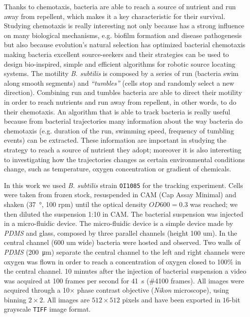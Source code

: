\documentclass[conference]{IEEEtran}
\begin{document}
Thanks to chemotaxis, bacteria are able to reach a source of nutrient and run away from repellent, which makes it a key characteristic for their survival. Studying chemotaxis is really interesting not only because has a strong influence on many biological mechanisms, e.g. biofilm formation and disease pathogenesis but also because  evolution's natural selection has optimized bacterial chemotaxis making bacteria excellent source-seekers and their strategies can be used to design bio-inspired, simple and efficient algorithms for robotic source locating systems. 
The motility  \textit{B. subtilis} is composed by a series of run (bacteria swim along smooth segments) and \textit{``tumbles''} (cells stop and randomly select a new direction).
Combining run and tumbles bacteria are able to direct their motility in order to reach nutrients and run away from repellent, in other words, to do their chemotaxis.
An algorithm that is able to track bacteria is really useful  because from bacterial trajectories many information about the way bacteria do chemotaxis (e.g. duration of the run, swimming speed, frequency of tumbling events) can be extracted. 
These information are important in studying the strategy to reach a source of nutrient they adopt; moreover it is also interesting to investigating how the trajectories changes as certain environmental conditions change, such as temperature, oxygen concentration or gradient of chemicals.


In this work we used \textit{B. subtilis} strain \texttt{OI1085} for the tracking experiment. Cells were taken from frozen stock, resuspended in CAM (Cap Assay Minimal) and shaken  (\SI{37}{\degree}, 100 rpm) until the optical density $OD600=0.3$ was reached; we then diluted the suspension 1:10 in CAM. The bacterial suspension was injected in a micro-fluidic device. The micro-fluidic device is a simple device made by \textit{PDMS} and glass, composed by three parallel channels (height 100 um). In the central channel (600 um wide) bacteria were hosted and observed. Two  walls of \textit{PDMS} (\SI{200}{\micro\metre}) separate the central channel to the left and right channels were oxygen was flown in order to reach a concentration of oxygen closed to 100\% in the central channel. 10 minutes after the injection of bacterial suspension a video was acquired at 100 frames per second for \SI{41}{\second}  (\#4100 frames). All images were acquired through a 10$\times$ phase contrast objective (\textit{Nikon} microscope), using binning $2 \times 2$.
All images are $512 \times 512$ pixels and have been exported in $16$-bit grayscale \texttt{TIFF} image format.
\end{document}
